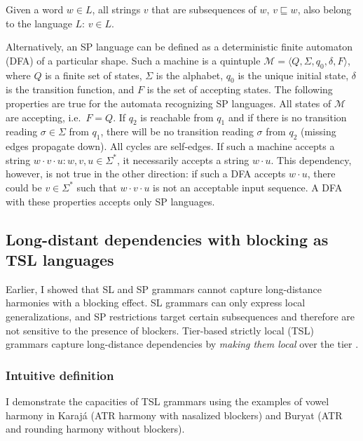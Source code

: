 \begin{definition}
Given a word $w \in L$, all strings $v$ that are subsequences of $w$, $v \sqsubseteq w$, also belong to the language $L$: $v \in L$.
\end{definition}


Alternatively, an SP language can be defined as a deterministic finite automaton (DFA) of a particular shape.
Such a machine is a quintuple $\mathcal{M} = \langle Q, \Sigma, q_0, \delta, F\rangle$, where $Q$ is a finite set of states, $\Sigma$ is the alphabet, $q_0$ is the unique initial state, $\delta$ is the transition function, and $F$ is the set of accepting states.
The following properties are true for the automata recognizing SP languages.
All states of $\mathcal{M}$ are accepting, i.e.\ $F = Q$.
If $q_2$ is reachable from $q_1$ and if there is no transition reading $\sigma \in \Sigma$ from $q_1$, there will be no transition reading $\sigma$ from $q_2$ (missing edges propagate down).
All cycles are self-edges.
If such a machine accepts a string $w\cdot v\cdot u : w, v, u \in \Sigma^{*}$, it necessarily accepts a string $w\cdot u$.
This dependency, however, is not true in the other direction: if such a DFA accepts $w\cdot u$, there could be $v \in \Sigma^*$ such that $w\cdot v\cdot u$ is not an acceptable input sequence.
A DFA with these properties accepts only SP languages.







\subsection{Long-distant dependencies with blocking as TSL languages}


Earlier, I showed that SL and SP grammars cannot capture long-distance harmonies with a blocking effect.
SL grammars can only express local generalizations, and SP restrictions target certain subsequences and therefore are not sensitive to the presence of blockers.
Tier-based strictly local (TSL) grammars capture long-distance dependencies by \emph{making them local} over the tier \citep{HeinzRawal11}.

\subsubsection{Intuitive definition}

I demonstrate the capacities of TSL grammars using the examples of vowel harmony in Karaj\'a (ATR harmony with nasalized blockers) and Buryat (ATR and rounding harmony without blockers).

